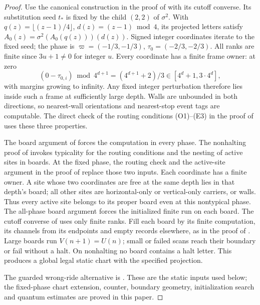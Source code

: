 \begin{proof}
Use the canonical construction in the proof of \cite[Lemma~11.2]{DMNoise2026} with its cutoff converse. Its substitution seed \(t_*\) is fixed by the child
\((2,2)\) of \(\sigma^2\). With
\(q(z)=\lfloor(z-1)/4\rfloor\), \(d(z)=(z-1)\bmod4\), its projected
letters satisfy
\(A_0(z)=\sigma^2(A_0(q(z)))(d(z))\). Signed integer coordinates
iterate to the fixed seed; the phase is
\(\varpi=(-1/3,-1/3)\), \(\tau_0=(-2/3,-2/3)\).
All ranks are finite since \(3u+1\ne0\) for integer \(u\).
Every coordinate has a finite frame owner: at zero
\[
 (0-\tau_{0,i})\bmod4^{d+1}=(4^{d+1}+2)/3
 \in[4^d+1,3\cdot4^d],
\]
with margins growing to infinity. Any fixed integer perturbation
therefore lies inside such a frame at sufficiently large depth.
Walls are unbounded in both directions, so nearest-wall orientations
and nearest-stop event tags are computable. The direct check of the routing conditions (O1)--(E3) in the proof of \cite[Lemma~11.2]{DMNoise2026} uses these three properties.

The board argument of \cite[Lemma~3.3]{DMNoise2026} forces the computation in every phase. The nonhalting proof of \cite[Proposition~4.3]{DMNoise2026} invokes typicality for the routing conditions and the nesting of active sites in boards. At the fixed phase, the routing check and the active-site argument in the proof of \cite[Lemma~11.2]{DMNoise2026} replace those two inputs. Each coordinate has a finite owner. A site whose two coordinates are free
at the same depth lies in that depth's board; all other sites are
horizontal-only or vertical-only carriers, or walls. Thus every active
site belongs to its proper board even at this nontypical phase.
The all-phase board argument forces the initialized finite run on each
board. The cutoff converse of \cite[Lemma~3.2]{DMNoise2026} uses only
finite ranks. Fill each board by
its finite computation, its channels from its endpoints and empty
records elsewhere, as in the proof of \cite[Proposition~4.3]{DMNoise2026}. Large boards run
\(V(n+1)=U(n)\); small or failed scans reach their boundary or fail
without a halt. On nonhalting no board contains a halt letter.
This produces a global legal static chart with the specified projection.

The guarded wrong-ride alternative is \cite[Proposition~4.3 and Lemma~10.5]{DMNoise2026}. These are the static inputs used below; the fixed-phase chart extension, counter, boundary geometry, initialization search and quantum estimates are proved in this paper.
\end{proof}

